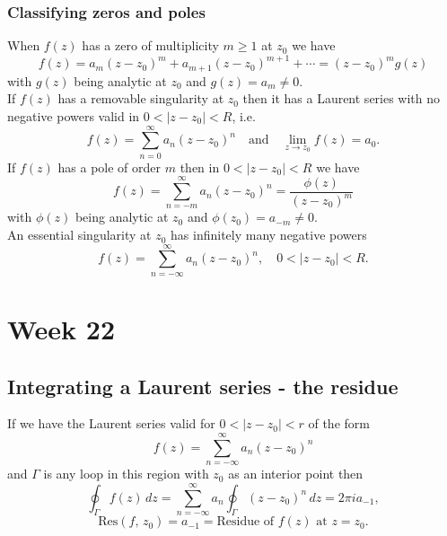 \documentclass{article}
\begin{document}
\subsubsection{Classifying zeros and poles}
When $f(z)$ has a zero of multiplicity $m\geq 1$ at $z_0$ we have
\begin{equation}
    f(z) = a_m(z-z_0)^m + a_{m+1}(z-z_0)^{m+1} + \cdots = (z-z_0)^m g(z)
\end{equation}
with $g(z)$ being analytic at $z_0$ and $g(z) = a_m \neq 0$.\\
If $f(z)$ has a removable singularity at $z_0$ then it has a Laurent series with no negative powers valid in $0<\vert z-z_0 \vert<R$, i.e. 
\begin{equation}
    f(z) = \sum_{n=0}^\infty a_n(z-z_0)^n \quad\text{and}\quad \lim_{z\to z_0}f(z) = a_0.
\end{equation}
If $f(z)$ has a pole of order $m$ then in $0<\vert z-z_0\vert<R$ we have
\begin{equation}
    f(z) = \sum_{n=-m}^\infty a_n(z-z_0)^n = \frac{\phi(z)}{(z-z_0)^m}
\end{equation}
with $\phi(z)$ being analytic at $z_0$ and $\phi(z_0) = a_{-m}\neq 0$. \\
An essential singularity at $z_0$ has infinitely many negative powers 
\begin{equation}
    f(z) = \sum_{n=-\infty}^\infty a_n(z-z_0)^n,\quad 0<\vert z-z_0\vert<R.
\end{equation}





\section{Week 22}
\subsection{Integrating a Laurent series - the residue}
If we have the Laurent series valid for $0<\vert z-z_0\vert<r$ of the form
\begin{equation}
    f(z) = \sum_{n=-\infty}^\infty a_n(z-z_0)^n
\end{equation}
and $\Gamma$ is any loop in this region with $z_0$ as an interior point then
\begin{equation}
    \oint_\Gamma f(z)\,dz = \sum_{n=-\infty}^\infty a_n\oint_\Gamma (z-z_0)^n\,dz = 2\pi ia_{-1},
\end{equation}
\begin{equation}
    \text{Res}(f,\,z_0) = a_{-1} = \text{Residue of }f(z)\text{ at } z=z_0.
\end{equation}
\end{document}
